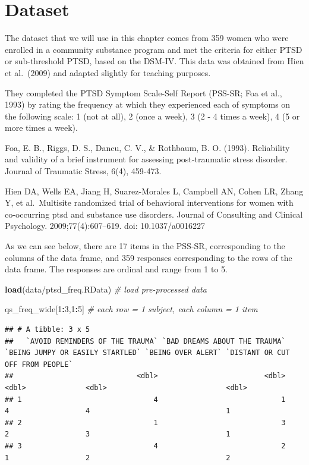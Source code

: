 \documentclass[
]{book}
\newenvironment{Shaded}{\begin{snugshade}}{\end{snugshade}}
\newcommand{\CommentTok}[1]{\textcolor[rgb]{0.56,0.35,0.01}{\textit{#1}}}
\newcommand{\DecValTok}[1]{\textcolor[rgb]{0.00,0.00,0.81}{#1}}
\newcommand{\FunctionTok}[1]{\textcolor[rgb]{0.13,0.29,0.53}{\textbf{#1}}}
\newcommand{\NormalTok}[1]{#1}
\newcommand{\SpecialCharTok}[1]{\textcolor[rgb]{0.81,0.36,0.00}{\textbf{#1}}}
\newcommand{\StringTok}[1]{\textcolor[rgb]{0.31,0.60,0.02}{#1}}
\begin{document}
\section{Dataset}\label{dataset}

The dataset that we will use in this chapter comes from 359 women who were enrolled in a community substance program and met the criteria for either PTSD or sub-threshold PTSD, based on the DSM-IV. This data was obtained from Hien et al.~(2009) and adapted slightly for teaching purposes.

They completed the PTSD Symptom Scale-Self Report (PSS-SR; Foa et al., 1993) by rating the frequency at which they experienced each of symptoms on the following scale: 1 (not at all), 2 (once a week), 3 (2 - 4 times a week), 4 (5 or more times a week).

Foa, E. B., Riggs, D. S., Dancu, C. V., \& Rothbaum, B. O. (1993). Reliability and validity of a brief instrument for assessing post‐traumatic stress disorder. Journal of Traumatic Stress, 6(4), 459-473.

Hien DA, Wells EA, Jiang H, Suarez-Morales L, Campbell AN, Cohen LR, Zhang Y, et al.~Multisite randomized trial of behavioral interventions for women with co-occurring ptsd and substance use disorders. Journal of Consulting and Clinical Psychology. 2009;77(4):607--619. doi: 10.1037/a0016227

As we can see below, there are 17 items in the PSS-SR, corresponding to the columns of the data frame, and 359 responses corresponding to the rows of the data frame. The responses are ordinal and range from 1 to 5.

\begin{Shaded}
\begin{Highlighting}[]
\FunctionTok{load}\NormalTok{(}\StringTok{\textquotesingle{}data/ptsd\_freq.RData\textquotesingle{}}\NormalTok{) }\CommentTok{\# load pre{-}processed data }

\NormalTok{qs\_freq\_wide[}\DecValTok{1}\SpecialCharTok{:}\DecValTok{3}\NormalTok{,}\DecValTok{1}\SpecialCharTok{:}\DecValTok{5}\NormalTok{] }\CommentTok{\# each row = 1 subject, each column = 1 item }
\end{Highlighting}
\end{Shaded}

\begin{verbatim}
## # A tibble: 3 x 5
##   `AVOID REMINDERS OF THE TRAUMA` `BAD DREAMS ABOUT THE TRAUMA` `BEING JUMPY OR EASILY STARTLED` `BEING OVER ALERT` `DISTANT OR CUT OFF FROM PEOPLE`
##                             <dbl>                         <dbl>                            <dbl>              <dbl>                            <dbl>
## 1                               4                             1                                4                  4                                1
## 2                               1                             3                                2                  3                                1
## 3                               4                             2                                1                  2                                2
\end{verbatim}
\end{document}
